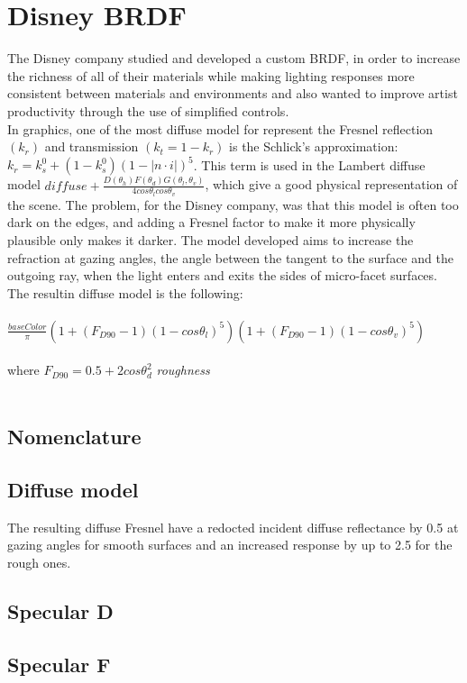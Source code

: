 \documentclass[11pt]{article}
\begin{document}
\section{Disney BRDF}
The Disney company studied and developed a custom BRDF, in order to increase the
richness of all of their materials while making lighting responses more consistent between materials and
environments and also wanted to improve artist productivity through the use of simplified controls.\\
In graphics, one of the most diffuse model for represent the Fresnel reflection $ (k_r) $ and transmission $ (k_t = 1 - k_r) $ is the Schlick's approximation:
$ k_r = k_s^0 + (1 - k_s^0)(1 - | n\cdot i|)^5$.
This term is used in the Lambert diffuse model $ diffuse + \frac{D(\theta_h)F(\theta_d)G(\theta_l,\theta_v)}{4cos\theta_lcos\theta_v} $, which give a good physical representation of the scene.
The problem, for the Disney company, was that this model is often too dark on the edges, and adding a Fresnel factor to make it more physically plausible only makes it darker.
The model developed aims to increase the refraction at gazing angles, the angle between the tangent to the surface and the outgoing ray, when the light enters and exits the sides of micro-facet surfaces.
The resultin diffuse model is the following:\\\\
$ \frac{baseColor}{\pi} (1 + (F_{D90} - 1)(1 - cos\theta_l)^5)(1 + (F_{D90} -1)(1 - cos\theta_v)^5)$\\\\
where  $F_{D90} = 0.5 + 2cos\theta_d^2$ \textit{roughness}\\\\
\subsection{Nomenclature}

\subsection{Diffuse model}

The resulting diffuse Fresnel have a redocted incident diffuse reflectance by 0.5 at gazing angles for smooth surfaces and an increased response by up to 2.5 for the rough ones.
\subsection{Specular D}
\subsection{Specular F}
\end{document}
